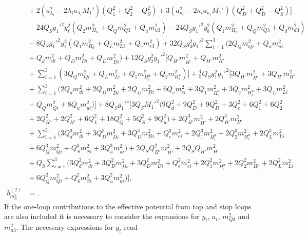 \documentclass[preprint,amsmath,amssymb,aps,superscriptaddress,prd,showpacs,floatfix,nofootinbib]{revtex4-1}
\begin{document}
\begin{subequations}
\begin{align}
&{}+2\left ( a_{\lambda_i}^2-2\lambda_ia_{\lambda_i}M_1'\right )\left ( Q_1^2+Q_2^2-Q_S^2\right )+3\left ( a_{\kappa_i}^2-2\kappa_ia_{\kappa_i}M_1'\right )\left ( Q_D^2+Q_{\overline{D}}^2-Q_S^2\right )\bigg ]\nonumber\\
&{}-24Q_Sg_1'^2y_t^2\left ( Q_2m_{H_u}^2+Q_Qm_{Q3}^2+Q_um_{u3}^2\right )-24Q_Sg_1'^2y_b^2\left ( Q_1m_{H_d}^2+Q_Qm_{Q3}^2+Q_dm_{d3}^2\right )\nonumber\\
&{}-8Q_Sg_1'^2y_\tau^2\left ( Q_1m_{H_d}^2+Q_Lm_{L3}^2+Q_em_{e3}^2\right )+32Q_Sg_3^2g_1'^2\sum_{i=1}^3\big ( 2Q_Qm_{Qi}^2+Q_um_{ui}^2\nonumber\\
&{}+Q_dm_{di}^2+Q_Dm_{Di}^2+Q_{\overline{D}}m_{\overline{D}i}^2\big )+12Q_Sg_2^2g_1'^2\bigg [ Q_{\overline{H'}}m_{\overline{H'}}^2+Q_{H'}m_{H'}^2\nonumber\\
&{}+\sum_{i=1}^3\left ( 3Q_Qm_{Qi}^2+Q_Lm_{Li}^2+Q_1m_{H_i^d}^2+Q_2m_{H_i^u}^2\right )\bigg ]+\frac{4}{5}Q_Sg_1^2g_1'^2\bigg [ 3Q_{\overline{H'}}m_{\overline{H'}}^2+3Q_{H'}m_{H'}^2\nonumber\\
&{}+\sum_{i=1}^3\big ( 2Q_dm_{di}^2+2Q_{\overline{D}}m_{\overline{D}i}^2+2Q_Dm_{Di}^2+6Q_em_{ei}^2+3Q_1m_{H_i^d}^2+3Q_2m_{H_i^u}^2+3Q_Lm_{Li}^2\nonumber\\
&{}+Q_Qm_{Qi}^2+8Q_um_{ui}^2\big )\bigg ]+8Q_Sg_1'^4\bigg [ 3Q_SM_1'^2\big ( 9Q_d^2+9Q_{\overline{D}}^2+9Q_D^2+3Q_e^2+6Q_1^2+6Q_2^2\nonumber\\
&{}+2Q_{\overline{H'}}^2+2Q_{H'}^2+6Q_L^2+18Q_Q^2+5Q_S^2+9Q_u^2\big )+2Q_{\overline{H'}}^3m_{\overline{H'}}^2+2Q_{H'}^3m_{H'}^2\nonumber\\
&{}+\sum_{i=1}^3\big ( 3Q_d^3m_{di}^2+3Q_{\overline{D}}^3m_{\overline{D}i}^2+3Q_D^3m_{Di}^2+Q_e^3m_{ei}^2+2Q_1^3m_{H_i^d}^2+2Q_2^3m_{H_i^u}^2+2Q_L^3m_{Li}^2\nonumber\\
&{}+6Q_Q^3m_{Qi}^2+Q_S^3m_{Si}^2+3Q_u^3m_{ui}^2\big )+2Q_SQ_{\overline{H'}}^2m_{\overline{H'}}^2+2Q_SQ_{H'}m_{H'}^2\nonumber\\
&{}+Q_S\sum_{i=1}^3\big ( 3Q_d^2m_{di}^2+3Q_{\overline{D}}^2m_{\overline{D}i}^2+3Q_D^2m_{Di}^2+Q_e^2m_{ei}^2+2Q_1^2m_{H_i^d}^2+2Q_2^2m_{H_i^u}^2+2Q_L^2m_{Li}^2\nonumber\\
&{}+6Q_Q^2m_{Qi}^2+Q_S^2m_{Si}^2+3Q_u^2m_{ui}^2\big )\bigg ],\label{eq:USSMms2BetaTwoLoop}\\
b_{m_S^2}^{(2)}&=.\label{eq:USSMms2Ot2Coeff}
\end{align}
\end{subequations}
If the one-loop contributions to the effective potential from top and stop loops are also included it is necessary to consider the expansions for $y_t$, $a_t$, $m_{Q3}^2$ and $m_{u3}^2$. The necessary expressions for $y_t$ read
\end{document}

